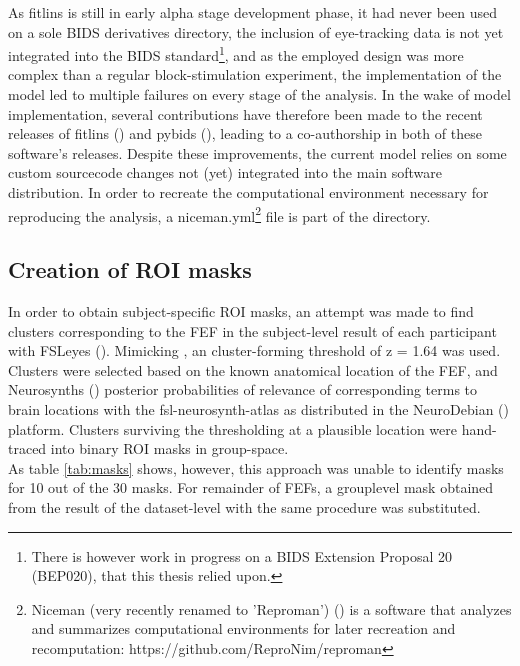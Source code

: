 \documentclass[a4paper, 12pt]{scrreprt}
\begin{document}
As fitlins is still in early alpha stage development phase, it had never been used on a sole BIDS derivatives directory, the inclusion of eye-tracking data is not yet integrated into the BIDS standard\footnote{There is however work in progress on a BIDS Extension Proposal 20 (BEP020), that this thesis relied upon.}, and as the employed design was more complex than a regular block-stimulation experiment, the implementation of the model led to multiple failures on every stage of the analysis. In the wake of model implementation, several contributions have therefore been made to the recent releases of fitlins (\cite{markiewicz_christopher_j_2019_2555453}) and pybids (\cite{yarkoni_tal_2019_2555449}), leading to a co-authorship in both of these software's releases.
Despite these improvements, the current model relies on some custom sourcecode changes not (yet) integrated into the main software distribution. In order to recreate the computational environment necessary for reproducing the analysis, a niceman.yml\footnote{Niceman (very recently renamed to 'Reproman') (\cite{yaroslav_halchenko_2018_2403222}) is a software that analyzes and summarizes computational environments for later recreation and recomputation: https://github.com/ReproNim/reproman} file is part of the directory. 

\subsection{Creation of ROI masks}\label{c2:masks}
In order to obtain subject-specific ROI masks, an attempt was made to find clusters corresponding to the FEF in the subject-level result of each participant with FSLeyes (\cite{mccarthy_paul_2018_1887737}). Mimicking \textcite{sengupta2016studyforrest}, an cluster-forming threshold of z = 1.64 was used. Clusters were selected based on the known anatomical location of the FEF, and Neurosynths (\cite{yarkoni2011neurosynth}) posterior probabilities of relevance of corresponding terms to brain locations with the fsl-neurosynth-atlas as distributed in the NeuroDebian (\cite{10.3389/fninf.2012.00022}) platform. Clusters surviving the thresholding at a plausible location were hand-traced into binary ROI masks in group-space. \\
As table \ref{tab:masks} shows, however, this approach was unable to identify masks for 10 out of the 30 masks. For remainder of FEFs, a grouplevel mask obtained from the result of the dataset-level with the same procedure was substituted.
\end{document}
